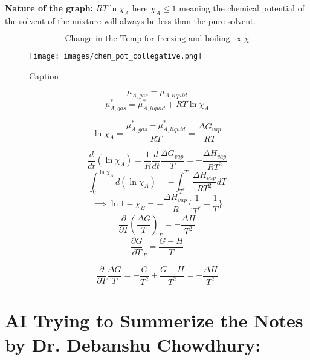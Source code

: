 \documentclass{article}
\theoremstyle{definition}
\begin{document}

\textbf{Nature of the graph:} $RT\ln{\chi_A}$ here $\chi_A \leq 1$ meaning the chemical potential of the solvent of the mixture will always be less than the pure solvent.

\[
\text{Change in the Temp for freezing and boiling } \propto \chi
\]

\begin{figure}
    \centering
    \texttt{[image: images/chem\_pot\_collegative.png]}
    \caption{Caption}
    \label{fig:enter-label}
\end{figure}

\[
\mu_{A,gas} = \mu_{A, liquid}
\]
\[
\mu_{A,gas}^* = \mu_{A,liquid}^* + RT\ln{\chi_A}
\]

\[
\ln{\chi_A} = \frac{\mu_{A,gas}^* - \mu_{A,liquid}^*}{RT} = \frac{\Delta G_{vap}}{RT}
\]

\[
\frac{d}{dt}(\ln{\chi_A}) = \frac{1}{R} \frac{d}{dt} \frac{\Delta G_{vap}}{T} = - \frac{\Delta H_{vap}}{RT^2}
\]
\[
\int_0^{\ln{\chi_A}} d(\ln{\chi_A}) = - \int_{T^*}^{T} \frac{\Delta H_{vap}}{RT^2} dT
\]
\[
\implies \ln{1-\chi_B} =  -\frac{\Delta H_{vap}}{R}\{\frac{1}{T^*}- \frac{1}{T}\}
\]
\[
\frac{\partial }{\partial T}(\frac{\Delta G}{T})_P = - \frac{\Delta H}{T^2}
\]
\[
\frac{\partial G}{\partial T}_P = \frac{G-H}{T}
\]

\[
\frac{\partial}{\partial T} \frac{\Delta G}{T} = -\frac{G}{T^2} + \frac{G-H}{T^2} = -\frac{\Delta H}{T^2}
\]

\section{AI Trying to Summerize the Notes by Dr. Debanshu Chowdhury:}
\end{document}
